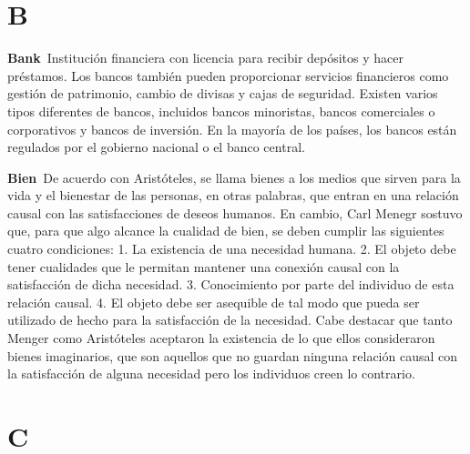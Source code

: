 \documentclass[10pt,a4paper,twoside]{article} %
\newcommand{\entry}[2]{\markboth{#1}{#1}\textbf{#1}\ {#2}}  %
\begin{document}

\newpage

\section{B}

\begin{multicols}{2}


\entry{Bank}{Institución financiera con licencia para recibir depósitos y hacer préstamos. Los bancos también pueden proporcionar servicios financieros como gestión de patrimonio, cambio de divisas y cajas de seguridad. Existen varios tipos diferentes de bancos, incluidos bancos minoristas, bancos comerciales o corporativos y bancos de inversión. En la mayoría de los países, los bancos están regulados por el gobierno nacional o el banco central.}

\entry{Bien}{De acuerdo con Aristóteles, se llama bienes a los medios que sirven para la vida y el bienestar de las personas, en otras palabras, que entran en una relación causal con las satisfacciones de deseos humanos. En cambio, Carl Menegr sostuvo que, para que algo alcance la cualidad de bien, se deben cumplir las siguientes cuatro condiciones: 1. La existencia de una necesidad humana. 2. El objeto debe tener cualidades que le permitan mantener una conexión causal con la satisfacción de dicha necesidad. 3. Conocimiento por parte del individuo de esta relación causal. 4. El objeto debe ser asequible de tal modo que pueda ser utilizado de hecho para la satisfacción de la necesidad. Cabe destacar que tanto Menger como Aristóteles aceptaron la existencia de lo que ellos consideraron bienes imaginarios, que son aquellos que no guardan ninguna relación causal con la satisfacción de alguna necesidad pero los individuos creen lo contrario.}

\end{multicols}


\newpage

\section{C}
\end{document}
